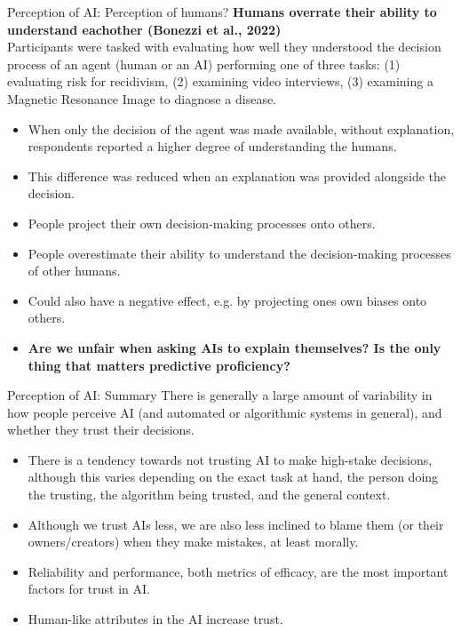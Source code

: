 \documentclass[8pt]{beamer}
\begin{document}
	\begin{frame}[t]{Perception of AI: Perception of humans?}
		\textbf{Humans overrate their ability to understand eachother (Bonezzi et al., 2022)}\\
		Participants were tasked with evaluating how well they understood the decision process of an agent (human or an AI) performing one of three tasks: (1) evaluating risk for recidivism, (2) examining video interviews, (3) examining a Magnetic Resonance Image to diagnose a disease.
		\begin{itemize}
			\item When only the decision of the agent was made available, without explanation, respondents reported a higher degree of understanding the humans.
			\item This difference was reduced when an explanation was provided alongside the decision.
			\item People project their own decision-making processes onto others.
			\item People overestimate their ability to understand the decision-making processes of other humans.
			\item Could also have a negative effect, e.g. by projecting ones own biases onto others.
			\item <2> \textbf{Are we unfair when asking AIs to explain themselves? Is the only thing that matters predictive proficiency?}
		\end{itemize}
	\end{frame}

	\begin{frame}[t]{Perception of AI: Summary}
		There is generally a large amount of variability in how people perceive AI (and automated or algorithmic systems in general), and whether they trust their decisions.
		\begin{itemize}
			\item There is a tendency towards not trusting AI to make high-stake decisions, although this varies depending on the exact task at hand, the person doing the trusting, the algorithm being trusted, and the general context.
			\item Although we trust AIs less, we are also less inclined to blame them (or their owners/creators) when they make mistakes, at least morally.
			\item Reliability and performance, both metrics of efficacy, are the most important factors for trust in AI.
			\item Human-like attributes in the AI increase trust.
		\end{itemize}
	\end{frame}
\end{document}
